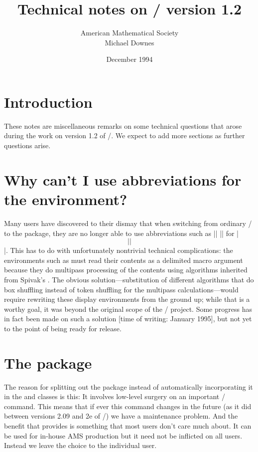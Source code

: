 \documentclass{amsdtx}
\title{Technical notes on \amslatex/ version 1.2}
\author{American Mathematical Society\\Michael Downes}
\date{December 1994}
\begin{document}
\maketitle

\section{Introduction}

These notes are miscellaneous remarks on some technical questions that
arose during the work on version 1.2 of \amslatex/. We expect to
add more sections as further questions arise.

\section{Why can't I use abbreviations for the 
environment?}

Many users have discovered to their dismay that when switching from
ordinary \latex/ to the  package, they are no longer able
to use abbreviations such as |\beq| |\eeq| for |\begin{equation}|
|\end{equation}|. This has to do with unfortunately nontrivial technical
complications: the environments such as  must read their
contents as a delimited macro argument because they do multipass
processing of the contents using algorithms inherited from Spivak's
. The obvious solution---substitution of different
algorithms that do box shuffling instead of token shuffling for the
multipass calculations---would require rewriting these display
environments from the ground up; while that is a worthy goal, it was
beyond the original scope of the \amslatex/ project. Some progress has
in fact been made on such a solution [time of writing: January 1995],
but not yet to the point of being ready for release.

\section{The  package}

The reason for splitting out the  package instead of
automatically incorporating it in the  and 
classes is this: It involves low-level surgery on an important \latex/
command. This means that if ever this command changes in the future (as
it did between versions 2.09 and 2e of \latex/) we have a maintenance
problem. And the benefit that  provides is something that
most users don't care much about. It can be used for in-house AMS
production but it need not be inflicted on all users. Instead we leave
the choice to the individual user.
\end{document}
